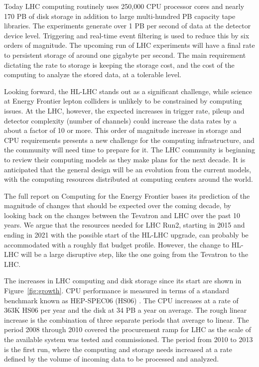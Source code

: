 Today LHC computing routinely uses 250,000 CPU processor cores and nearly 170
PB of disk storage in addition to large multi-hundred PB capacity
tape libraries.  The experiments generate over 1 PB per second of data
at the detector device level. Triggering and real-time event filtering  is
used to reduce this by six orders of magnitude. 
The upcoming run of LHC experiments will have a final rate to persistent
storage of around one gigabyte per second. 
The main requirement dictating the rate to
storage is keeping the storage cost, and the  cost of the computing to analyze
the stored data, at a tolerable level.

Looking forward, the HL-LHC stands out as a significant challenge, while
science at Energy Frontier lepton colliders is unlikely to be constrained by computing
issues.  At the LHC, however, the expected increases in trigger rate, pileup
and detector complexity (number of channels) could increase the data rates by
a about a factor of 10 or more.   This order of magnitude increase in storage
and CPU requirements presents a new challenge for the computing infrastructure,
and the community will need time to prepare for it. The LHC community is
beginning to review their computing models as they make plans for the next
decade.  It is anticipated that the general design will be an evolution from
the current models, with the computing resources distributed at computing
centers around the world.

The full report on Computing for the Energy Frontier bases its  prediction of the magnitude
of changes that should be expected over the coming decade, by looking back
on  the changes between the Tevatron and LHC over the past 10 years. We argue
that the resources needed for LHC Run2, starting in 2015 and ending
in 2021 with the possible start of  the HL-LHC upgrade, can probably be
accommodated with a roughly flat budget profile. However, the change to HL-LHC
will be a large disruptive step, like the one going from the Tevatron to the
LHC.

The increases in LHC computing and disk storage since its start are shown in
Figure~\ref{fig:growth}.  CPU performance is measured in terms of a standard
benchmark known as HEP-SPEC06 (HS06) \cite{HS06}.
The CPU increases at a rate of 363K HS06 per year and
the disk at 34 PB a year on average.  The rough linear increase is the
combination of three separate periods that average to linear.  The period
2008 through 2010 covered the procurement ramp for LHC as the scale of the
available system was tested and commissioned. The period from 2010 to 2013 is
the first run, 
where the computing and storage needs increased at a rate defined by 
the volume of incoming data to be processed and analyzed.

